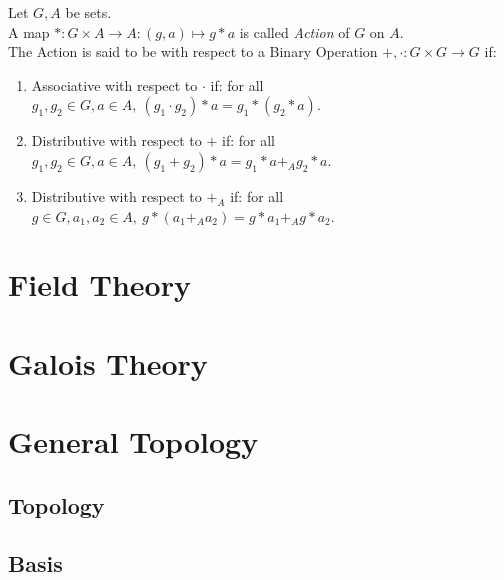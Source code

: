 \documentclass[twoside,openright]{report}
\begin{document}
\begin{definition}
    Let $G, A$ be sets. \\
    A map $\ast: G \times A \to A:(g, a) \mapsto g \ast a$ is called \textit{Action} of $G$ on $A$. \\
    The Action is said to be with respect to a Binary Operation $+, \cdot:G \times G \to G$ if:
    \begin{enumerate}
        \item Associative with respect to $\cdot$ if: for all $g_1, g_2 \in G, a \in A,\ (g_1 \cdot g_2) \ast a = g_1 \ast (g_2 \ast a)$.
        \item Distributive with respect to $+$ if: for all $g_1, g_2 \in G, a \in A,\ (g_1 + g_2) \ast a = g_1 \ast a +_A g_2 \ast a$.
        \item Distributive with respect to $+_A$ if: for all $g \in G, a_1, a_2 \in A,\ g \ast (a_1 +_A a_2) = g \ast a_1 +_A g \ast a_2$.
    \end{enumerate}
\end{definition}











\chapter{Field Theory}

\chapter{Galois Theory}




\chapter{General Topology}
\section{Topology}
\section{Basis}
\end{document}
